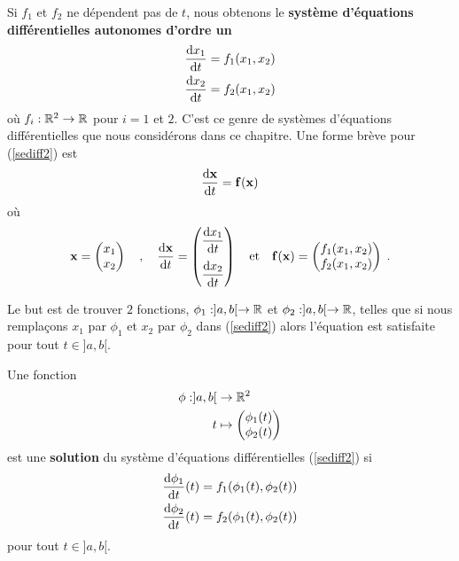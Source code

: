 {Si $f_1$ et $f_2$ ne dépendent pas de $t$, nous obtenons le
{\bfseries système d'équations différentielles autonomes
d'ordre un}
\begin{equation} \label{sediff2}
\begin{split}
\frac{\mathrm{d}x_1}{\mathrm{d}t} &= f_1(x_1,x_2) \\
\frac{\mathrm{d}x_2}{\mathrm{d}t} &= f_2(x_1,x_2)
\end{split}
\end{equation}
où $f_i:\mathbb{R}^2 \rightarrow \mathbb{R}$ pour $i=1$ et $2$.  C'est ce genre de
systèmes d'équations différentielles que nous considérons dans ce
chapitre.  Une forme brève pour (\ref{sediff2}) est
\begin{equation} \label{sediff3}
\frac{\mathrm{d}\mathbf{x}}{\mathrm{d}t} = \mathbf{f}(\mathbf{x})
\end{equation}
où
\[
\mathbf{x} = \begin{pmatrix} x_1 \\ x_2 \end{pmatrix}
\quad , \quad
\frac{\mathrm{d}\mathbf{x}}{\mathrm{d}t} =
\begin{pmatrix} \displaystyle \frac{\mathrm{d}x_1}{\mathrm{d}t} \\[1em]
\displaystyle \frac{\mathrm{d}x_2}{\mathrm{d}t} \end{pmatrix}
\quad \text{et} \quad
\mathbf{f}(\mathbf{x}) = \begin{pmatrix} f_1(x_1,x_2)\\
f_2(x_1,x_2)
\end{pmatrix} \; .
\]

Le but est de trouver $2$ fonctions, $\phi_1:]a,b[ \rightarrow \mathbb{R}$ et
$\phi_2:]a,b[ \rightarrow \mathbb{R}$, telles que si nous remplaçons $x_1$ par
$\phi_1$ et $x_2$ par $\phi_2$ dans (\ref{sediff2}) alors l'équation
est satisfaite pour tout $t \in ]a,b[$.

\begin{focus}{\dfn} 
Une fonction
\begin{align*}
\phi:]a,b[ & \rightarrow \mathbb{R}^2 \\
t &\mapsto
\begin{pmatrix}
\phi_1(t) \\ \phi_2(t)
\end{pmatrix}
\end{align*}
est une {\bfseries solution} du système d'équations différentielles
(\ref{sediff2}) si
\[
\begin{split}
\frac{\mathrm{d}\phi_1}{\mathrm{d}t}(t) &= f_1(\phi_1(t),\phi_2(t)) \\
\frac{\mathrm{d}\phi_2}{\mathrm{d}t}(t) &= f_2(\phi_1(t),\phi_2(t))
\end{split}
\]
pour tout $t \in]a,b[$.
\end{focus}

}

